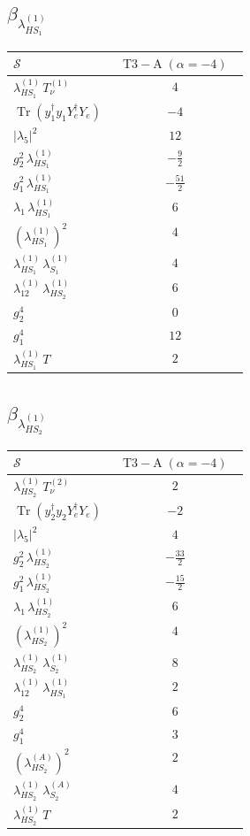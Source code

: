 \documentclass[9pt]{article}
\begin{document}
\subsection*{$ \beta_{\lambda_{HS_1}^{(1)}} $}
\begin{longtable}{@{}p{0.31\linewidth}c@{}}
\toprule
$\mathcal{S}$ & $ \mathrm{T3-A}\;(\alpha=-4) $ \\
\midrule
$ \lambda_{HS_1}^{(1)}\,T_{\nu}^{(1)} $ & $ 4 $ \\
$ \operatorname{Tr}(y_1^\dagger y_1Y_e^\dagger Y_e) $ & $ -4 $ \\
$ |\lambda_5|^2 $ & $ 12 $ \\
$ g_2^2\,\lambda_{HS_1}^{(1)} $ & $ - \frac{9}{2} $ \\
$ g_1^2\,\lambda_{HS_1}^{(1)} $ & $ - \frac{51}{2} $ \\
$ \lambda_1\,\lambda_{HS_1}^{(1)} $ & $ 6 $ \\
$ \left(\lambda_{HS_1}^{(1)}\right)^2 $ & $ 4 $ \\
$ \lambda_{HS_1}^{(1)}\,\lambda_{S_1}^{(1)} $ & $ 4 $ \\
$ \lambda_{12}^{(1)}\,\lambda_{HS_2}^{(1)} $ & $ 6 $ \\
$ g_2^4 $ & $ 0 $ \\
$ g_1^4 $ & $ 12 $ \\
$ \lambda_{HS_1}^{(1)}\,T $ & $ 2 $ \\
\bottomrule
\end{longtable}
\subsection*{$ \beta_{\lambda_{HS_2}^{(1)}} $}
\begin{longtable}{@{}p{0.31\linewidth}c@{}}
\toprule
$\mathcal{S}$ & $ \mathrm{T3-A}\;(\alpha=-4) $ \\
\midrule
$ \lambda_{HS_2}^{(1)}\,T_{\nu}^{(2)} $ & $ 2 $ \\
$ \operatorname{Tr}(y_2^\dagger y_2Y_e^\dagger Y_e) $ & $ -2 $ \\
$ |\lambda_5|^2 $ & $ 4 $ \\
$ g_2^2\,\lambda_{HS_2}^{(1)} $ & $ - \frac{33}{2} $ \\
$ g_1^2\,\lambda_{HS_2}^{(1)} $ & $ - \frac{15}{2} $ \\
$ \lambda_1\,\lambda_{HS_2}^{(1)} $ & $ 6 $ \\
$ \left(\lambda_{HS_2}^{(1)}\right)^2 $ & $ 4 $ \\
$ \lambda_{HS_2}^{(1)}\,\lambda_{S_2}^{(1)} $ & $ 8 $ \\
$ \lambda_{12}^{(1)}\,\lambda_{HS_1}^{(1)} $ & $ 2 $ \\
$ g_2^4 $ & $ 6 $ \\
$ g_1^4 $ & $ 3 $ \\
$ \left(\lambda_{HS_2}^{(A)}\right)^2 $ & $ 2 $ \\
$ \lambda_{HS_2}^{(1)}\,\lambda_{S_2}^{(A)} $ & $ 4 $ \\
$ \lambda_{HS_2}^{(1)}\,T $ & $ 2 $ \\
\bottomrule
\end{longtable}
\end{document}
